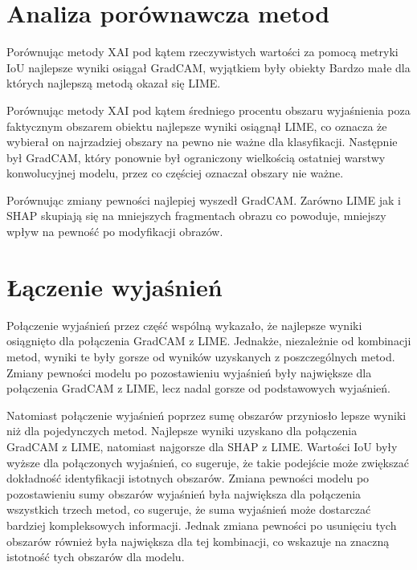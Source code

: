 \section*{Analiza porównawcza metod}

Porównując metody XAI pod kątem rzeczywistych wartości za pomocą metryki IoU najlepsze wyniki osiągał GradCAM, wyjątkiem były obiekty Bardzo małe dla których najlepszą metodą okazał się LIME.

Porównując metody XAI pod kątem średniego procentu obszaru wyjaśnienia poza faktycznym obszarem obiektu najlepsze wyniki osiągnął LIME, co oznacza że wybierał on najrzadziej obszary na pewno nie ważne dla klasyfikacji.
Następnie był GradCAM, który ponownie był ograniczony wielkością ostatniej warstwy konwolucyjnej modelu, przez co częściej oznaczał obszary nie ważne.

Porównując zmiany pewności najlepiej wyszedł GradCAM.
Zarówno LIME jak i SHAP skupiają się na mniejszych fragmentach obrazu co powoduje, mniejszy wpływ na pewność po modyfikacji obrazów.

\section*{Łączenie wyjaśnień}

Połączenie wyjaśnień przez część wspólną wykazało, że najlepsze wyniki osiągnięto dla połączenia GradCAM z LIME.
Jednakże, niezależnie od kombinacji metod, wyniki te były gorsze od wyników uzyskanych z poszczególnych metod.
Zmiany pewności modelu po pozostawieniu wyjaśnień były największe dla połączenia GradCAM z LIME, lecz nadal gorsze od podstawowych wyjaśnień.

Natomiast połączenie wyjaśnień poprzez sumę obszarów przyniosło lepsze wyniki niż dla pojedynczych metod.
Najlepsze wyniki uzyskano dla połączenia GradCAM z LIME, natomiast najgorsze dla SHAP z LIME.
Wartości IoU były wyższe dla połączonych wyjaśnień, co sugeruje, że takie podejście może zwiększać dokładność identyfikacji istotnych obszarów.
Zmiana pewności modelu po pozostawieniu sumy obszarów wyjaśnień była największa dla połączenia wszystkich trzech metod, co sugeruje, że suma wyjaśnień może dostarczać bardziej kompleksowych informacji.
Jednak zmiana pewności po usunięciu tych obszarów również była największa dla tej kombinacji, co wskazuje na znaczną istotność tych obszarów dla modelu.

